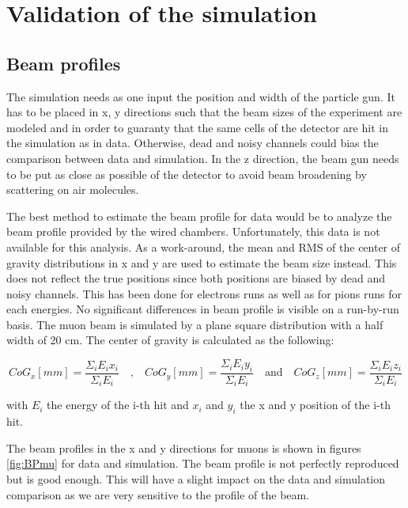 \chapter{Validation of the simulation}
\label{appendix:SimulationVal}

\section{Beam profiles}

The simulation needs as one input the position and width of the particle gun. It has to be placed in x, y directions such that the beam sizes of the experiment are modeled and in order to guaranty that the same cells of the detector are hit in the simulation as in data. Otherwise, dead and noisy channels could bias the comparison between data and simulation. In the z direction, the beam gun needs to be put as close as possible of the detector to avoid beam broadening by scattering on air molecules.

The best method to estimate the beam profile for data would be to analyze the beam profile provided by the wired chambers. Unfortunately, this data is not available for this analysis. As a work-around, the mean and RMS of the center of gravity distributions in x and y are used to estimate the beam size instead. This does not reflect the true positions since both positions are biased by dead and noisy channels. This has been done for electrons runs as well as for pions runs for each energies. No significant differences in beam profile is visible on a run-by-run basis. The muon beam is simulated by a plane square distribution with a half width of 20 cm. The center of gravity is calculated as the following:

\begin{equation}
  CoG_x [mm] = \frac{\Sigma_i E_i x_i}{\Sigma_i E_i} \quad \text{,} \quad CoG_y [mm] = \frac{\Sigma_i E_i y_i}{\Sigma_i E_i} \quad \text{and} \quad CoG_z [mm] = \frac{\Sigma_i E_i z_i}{\Sigma_i E_i}
\end{equation}

\noindent with $E_i$ the energy of the i-th hit and $x_i$ and $y_i$ the x and y position of the i-th hit.

The beam profiles in the x and y directions for muons is shown in figures \ref{fig:BPmu} for data and simulation. The beam profile is not perfectly reproduced but is good enough. This will have a slight impact on the data and simulation comparison as we are very sensitive to the
profile of the beam.

